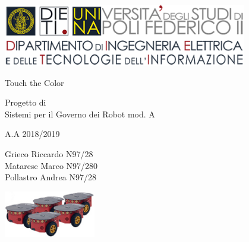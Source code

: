 
\thispagestyle{empty}

\begin{center}
	\includegraphics[width=0.8\textwidth]{images/DIETI}\\
	
	\par\bigskip\par\bigskip\par\bigskip
	\par\bigskip\par\bigskip\par\bigskip\par\bigskip\par\bigskip\par\bigskip\par\bigskip\par	%
	
	{\huge Touch the Color\\}
	
	\par\bigskip\par\bigskip\par\bigskip\par\bigskip\par\bigskip\par\bigskip\par\bigskip\par	%
	
	{\LARGE Progetto di \\}
	{\LARGE Sistemi per il Governo dei Robot mod. A\\}
	{\large A.A 2018/2019\par}
	
	\par\bigskip\par\bigskip\par\bigskip\par\bigskip\par\bigskip\par\bigskip
	
	{\large Grieco Riccardo N97/28 \\}
	{\large Matarese Marco N97/280 \\}
	{\large Pollastro Andrea N97/28 \\}
	
	\par\bigskip\par\bigskip\par\bigskip\par\bigskip\par\bigskip\par\bigskip	
	
	
	\includegraphics[width=0.3\textwidth]{images/pioneer.jpg}
\end{center}
